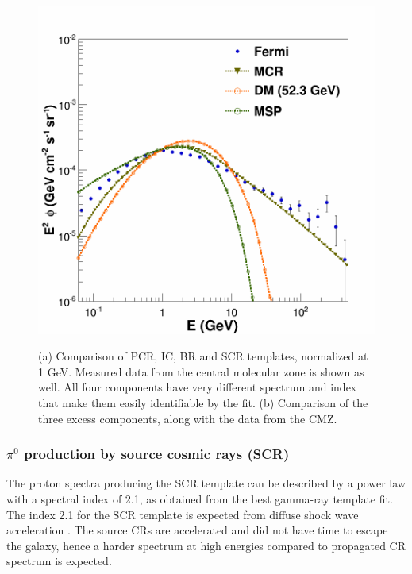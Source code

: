 \begin{figure}[h]
\begin{minipage}[h]{0.45\textwidth}
	  \includegraphics[width=1\linewidth]{pic/method/norm_excess_comp.png}
 	  \subcaption{}
 	  \label{fig:norm_excess_component}
  \end{minipage}
  \caption[Comparison of gamma-ray templates]{(a) Comparison of PCR, IC, BR and SCR templates, normalized at 1 GeV. Measured data from the central molecular zone is shown as well. All four components have very different spectrum and index that make them easily identifiable by the fit. (b) Comparison of the three excess components, along with the data from the CMZ.}
  \label{fig:norm_spectra} 
\end{figure}




%

\subsubsection{$\pi^0$ production by source cosmic rays (SCR)}

The proton spectra producing the SCR template can be described by a power law with a spectral index of 2.1, as obtained from the best gamma-ray template fit. The index 2.1 for the SCR template %
is expected from diffuse shock wave acceleration \cite{Biermann10} \cite{Hillas2005} .
The source CRs are accelerated and did not have time to escape the galaxy, hence a harder spectrum at high energies compared to propagated CR spectrum is expected.

